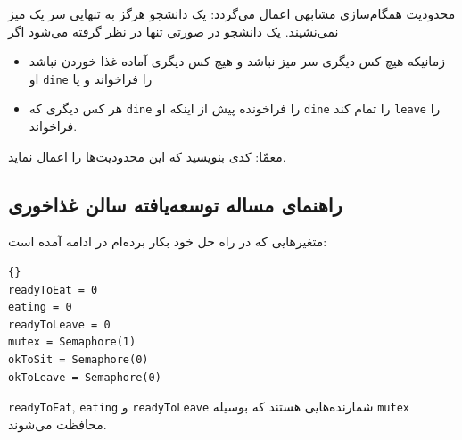 \documentclass{book}
\newcommand{\clearemptydoublepage}{\newpage\cleardoublepage}
\begin{document}
    محدودیت همگام‌سازی مشابهی اعمال می‌گردد: 
    یک دانشجو هرگز به تنهایی سر یک میز نمی‌نشیند. یک دانشجو در صورتی تنها در نظر گرفته می‌شود اگر 

\begin{itemize}

\item %
    زمانیکه هیچ کس دیگری سر میز نباشد و هیچ کس دیگری آماده غذا خوردن نباشد او {\tt dine} را فراخواند و یا 

\item %
    هر کس دیگری که {\tt dine} را فراخونده پیش از اینکه او {\tt dine} را تمام کند {\tt leave} را فراخواند. 

\end{itemize}

    معمّا: کدی بنویسید که این محدودیت‌ها را اعمال نماید. 


\clearemptydoublepage
\subsection{راهنمای مساله توسعه‌یافته سالن غذاخوری}

    متغیرهایی که در راه حل خود بکار برده‌ام در ادامه آمده است:‌

\begin{latin}
\begin{lstlisting}[title=\rl{راهنمای مساله توسعه‌یافته سالن غذاخوری}]{}
readyToEat = 0
eating = 0
readyToLeave = 0
mutex = Semaphore(1)
okToSit = Semaphore(0)
okToLeave = Semaphore(0)
\end{lstlisting}
\end{latin}

    {\tt readyToEat}, {\tt eating} و {\tt readyToLeave} 
    شمارنده‌هایی هستند که بوسیله {\tt mutex} محافظت می‌شوند. 
\end{document}
